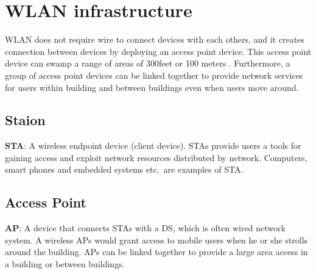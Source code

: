 \section{WLAN infrastructure}

\ac{WLAN} does not require wire to connect devices with each others, and it creates connection between devices by deploying an access point device. This access point device can swamp a range of areas of 300feet or 100 meters \cite{gopalakrishnan2014survey}. Furthermore, a group of access point devices can be linked together to provide network services for users within building and between buildings even when users move around.

\subsection{Staion}
\textbf{\ac{STA}}: A wireless endpoint device (client device). \ac{STA}s provide users a tools for gaining access and exploit network resources distributed by network. Computers, smart phones and embedded systems etc.\ are examples of \ac{STA}.

\subsection{Access Point}
\textbf{\ac{AP}}: A device that connects \ac{STA}s with a \ac{DS}, which is often wired network system. A wireless \ac{AP}s would grant access to mobile users when he or she strolls around the building. \ac{AP}s can be linked together to provide a large area access in a building or between buildings. 